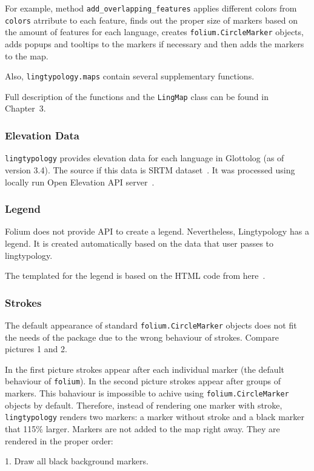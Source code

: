 \documentclass[a4paper,12pt]{article}
\begin{document}
For example, method \texttt{add\_overlapping\_features} applies different colors from \texttt{colors} atrribute to each feature, finds out the proper size of markers based on the amount of features for each language, creates \texttt{folium.CircleMarker} objects, adds popups and tooltips to the markers if necessary and then adds the markers to the map.

Also, \texttt{lingtypology.maps} contain several supplementary functions.

Full description of the functions and the \texttt{LingMap} class can be found in Chapter~3.

\subsubsection{Elevation Data}
\texttt{lingtypology} provides elevation data for each language in Glottolog (as of version 3.4). The source if this data is SRTM dataset~\parencite{SRTM}.
It was processed using locally run Open Elevation API server~\parencite{OpenElevation}.

\subsubsection{Legend}
Folium does not provide API to create a legend. Nevertheless, Lingtypology has a legend. It is created automatically based on the data that user passes to lingtypology.

The templated for the legend is based on the HTML code from here~\parencite{legend}.

\subsubsection{Strokes}
The default appearance of standard \texttt{folium.CircleMarker} objects does not fit the needs of the package due to the wrong behaviour of strokes. Compare pictures 1 and 2.

In the first picture strokes appear after each individual marker (the default behaviour of \texttt{folium}).
In the second picture strokes appear after groups of markers. This bahaviour is impossible to achive using \texttt{folium.CircleMarker} objects by default. Therefore, instead of rendering one marker with stroke, \texttt{lingtypology} renders two markers: a marker without stroke and a black marker that 115\% larger. Markers are not added to the map right away. They are rendered in the proper order:

1. Draw all black background markers.
\end{document}
